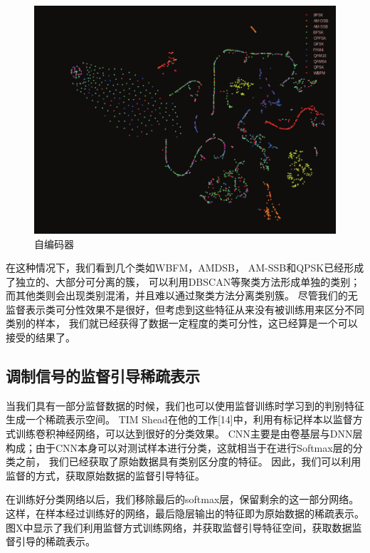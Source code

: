 \begin{figure}[!h]
	\centering
	\includegraphics[scale=0.2]{figures/chapter_3/cae_fea}
	\caption{自编码器}	\label{sec:fig_3_5}
\end{figure}

在这种情况下，我们看到几个类如WBFM，AMDSB， AM-SSB和QPSK已经形成了独立的、大部分可分离的簇，
可以利用DBSCAN等聚类方法形成单独的类别；而其他类则会出现类别混淆，并且难以通过聚类方法分离类别簇。 
尽管我们的无监督表示类可分性效果不是很好，但考虑到这些特征从来没有被训练用来区分不同类别的样本，
我们就已经获得了数据一定程度的类可分性，这已经算是一个可以接受的结果了。 \par 

\subsection{调制信号的监督引导稀疏表示}

当我们具有一部分监督数据的时候，我们也可以使用监督训练时学习到的判别特征生成一个稀疏表示空间。
TIM Shead在他的工作[14]中，利用有标记样本以监督方式训练卷积神经网络，可以达到很好的分类效果。
CNN主要是由卷基层与DNN层构成；由于CNN本身可以对测试样本进行分类，这就相当于在进行Softmax层的分类之前，
我们已经获取了原始数据具有类别区分度的特征。
因此，我们可以利用监督的方式，获取原始数据的监督引导特征。\par

在训练好分类网络以后，我们移除最后的softmax层，保留剩余的这一部分网络。
这样，在样本经过训练好的网络，最后隐层输出的特征即为原始数据的稀疏表示。
图X中显示了我们利用监督方式训练网络，并获取监督引导特征空间，获取数据监督引导的稀疏表示。\par

